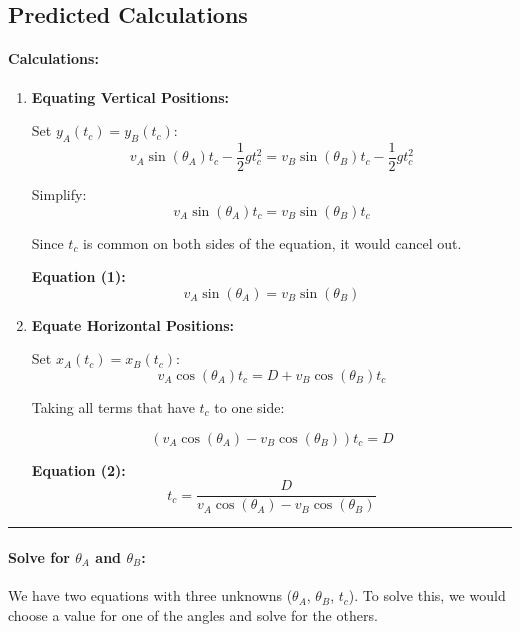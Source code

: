 \documentclass[12pt]{article}
\begin{document}
\subsection{Predicted Calculations}

\paragraph{Calculations:}
\begin{enumerate}
    \item \textbf{Equating Vertical Positions:} 
    
    Set \( y_A(t_c) = y_B(t_c) \):
    \[
    v_A \sin(\theta_A) t_c - \frac{1}{2} g t_c^2 = v_B \sin(\theta_B) t_c - \frac{1}{2} g t_c^2
    \]
    
    Simplify:
    \[
    v_A \sin(\theta_A) t_c = v_B \sin(\theta_B) t_c
    \]
    
    Since \( t_c \) is common on both sides of the equation, it would cancel out.
    
    \textbf{Equation (1):}
    \[
    v_A \sin(\theta_A) = v_B \sin(\theta_B)
    \]
    
    \item \textbf{Equate Horizontal Positions:} 
    
    Set \( x_A(t_c) = x_B(t_c) \):
    \[
    v_A \cos(\theta_A) t_c = D + v_B \cos(\theta_B) t_c
    \]
    
    Taking all terms that have \( t_c \) to one side:

    \[
    (v_A \cos(\theta_A) - v_B \cos(\theta_B)) t_c = D
    \]
    
    \textbf{Equation (2):}
    \[
    t_c = \frac{D}{v_A \cos(\theta_A) - v_B \cos(\theta_B)}
    \]
\end{enumerate}

\vspace{0.5cm} %
\begin{center}
    \rule{0.9\textwidth}{0.5pt} %
\end{center}
\vspace{0.5cm} %

\paragraph{\large \textbf{Solve for \( \theta_A \) and \( \theta_B \):}}

We have two equations with three unknowns (\( \theta_A \), \( \theta_B \), \( t_c \)). 
To solve this, we would choose a value for one of the angles and solve for the others.
\end{document}
